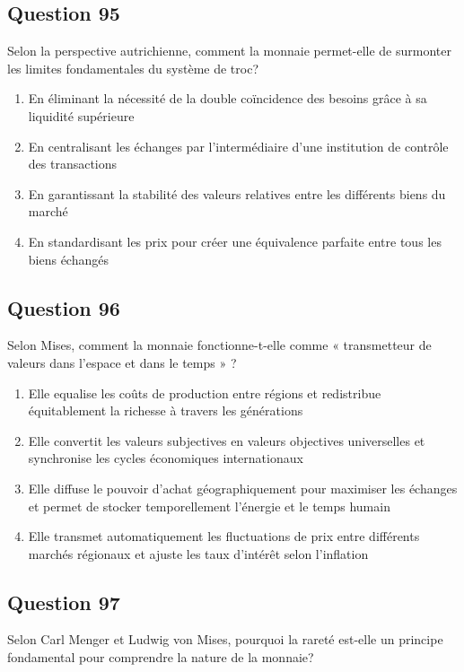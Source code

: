 \documentclass[12pt,a4paper]{article}
\begin{document}
\bigskip


\subsection*{Question 95}
Selon la perspective autrichienne, comment la monnaie permet-elle de surmonter les limites fondamentales du système de troc?

\begin{enumerate}[label=\Alph*., leftmargin=*]
\item En éliminant la nécessité de la double coïncidence des besoins grâce à sa liquidité supérieure
\item En centralisant les échanges par l'intermédiaire d'une institution de contrôle des transactions
\item En garantissant la stabilité des valeurs relatives entre les différents biens du marché
\item En standardisant les prix pour créer une équivalence parfaite entre tous les biens échangés
\end{enumerate}

\bigskip


\subsection*{Question 96}
Selon Mises, comment la monnaie fonctionne-t-elle comme « transmetteur de valeurs dans l'espace et dans le temps » ?

\begin{enumerate}[label=\Alph*., leftmargin=*]
\item Elle equalise les coûts de production entre régions et redistribue équitablement la richesse à travers les générations
\item Elle convertit les valeurs subjectives en valeurs objectives universelles et synchronise les cycles économiques internationaux
\item Elle diffuse le pouvoir d'achat géographiquement pour maximiser les échanges et permet de stocker temporellement l'énergie et le temps humain
\item Elle transmet automatiquement les fluctuations de prix entre différents marchés régionaux et ajuste les taux d'intérêt selon l'inflation
\end{enumerate}

\bigskip


\subsection*{Question 97}
Selon Carl Menger et Ludwig von Mises, pourquoi la rareté est-elle un principe fondamental pour comprendre la nature de la monnaie?
\end{document}

